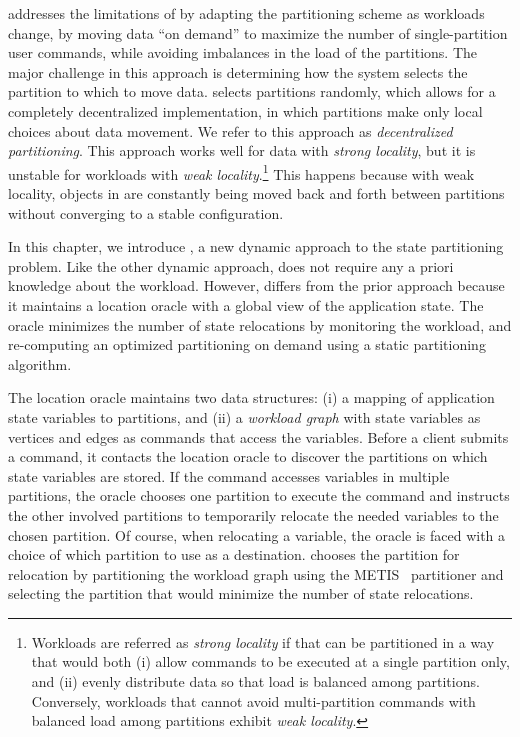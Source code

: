 
\dssmr{} addresses the limitations of \ssmr{} by adapting the partitioning
scheme as workloads change, by moving data ``on demand'' to maximize the number
of single-partition user commands, while avoiding imbalances in the load of the
partitions. The major challenge in this approach is determining how the system
selects the partition to which to move data. \dssmr{} selects partitions
randomly, which allows for a completely decentralized implementation, in which
partitions make only local choices about data movement. We refer to this
approach as \emph{decentralized partitioning}. This approach works well for data
with \emph{strong locality}, but it is unstable for workloads with \emph{weak
locality}.\footnote{Workloads are referred as \emph{strong locality} if that can
be partitioned in a way that would both (i) allow commands to be executed at a
single partition only, and (ii) evenly distribute data so that load is balanced
among partitions. Conversely, workloads that cannot avoid multi-partition
commands with balanced load among partitions exhibit \emph{weak locality}.}
This happens because with weak locality, objects in \dssmr{} are constantly
being moved back and forth between partitions without converging to a stable
configuration.

In this chapter, we introduce \dynastar, a new dynamic approach to the state
partitioning problem. Like the other dynamic approach, \dynastar does not
require any a priori knowledge about the workload. However, \dynastar differs
from the prior approach because it maintains a location oracle with a global
view of the application state. The oracle minimizes the number of state
relocations by monitoring the workload, and re-computing an optimized
partitioning on demand using a static partitioning algorithm.

The location oracle maintains two data structures: (i) a mapping of application
state variables to partitions, and (ii) a \emph{workload graph} with state
variables as vertices and edges as commands that access the variables. Before a
client submits a command, it contacts the location oracle to discover the
partitions on which state variables are stored.  If the command accesses
variables in multiple partitions, the oracle chooses one partition to execute
the command and instructs the other involved partitions to temporarily relocate
the needed variables to the chosen partition. Of course, when relocating a
variable, the oracle is faced with a choice of which partition to use as a
destination. \dynastar chooses the partition for relocation by partitioning the
workload graph using the METIS~\cite{Abou-Rjeili:2006} partitioner and selecting
the partition that would minimize the number of state relocations.

